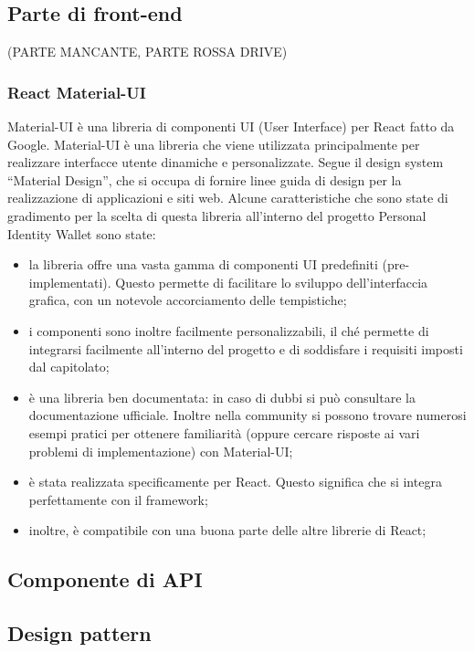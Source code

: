 \subsection{Parte di front-end}
(PARTE MANCANTE, PARTE ROSSA DRIVE)
\subsubsection{React Material-UI}
Material-UI è una libreria di componenti UI (User Interface) per React fatto da Google. Material-UI è una libreria che viene utilizzata principalmente per realizzare interfacce utente dinamiche e personalizzate.
Segue il design system “Material Design”, che si occupa di fornire linee guida di design per la realizzazione di applicazioni e siti web.
Alcune caratteristiche che sono state di gradimento per la scelta di questa libreria all’interno del progetto Personal Identity Wallet sono state:
\begin{itemize}
    \item la libreria offre una vasta gamma di componenti UI predefiniti (pre-implementati). Questo permette di facilitare lo sviluppo dell’interfaccia grafica, con un notevole accorciamento delle tempistiche;
    \item i componenti sono inoltre facilmente personalizzabili, il ché permette di integrarsi facilmente all’interno del progetto e di soddisfare i requisiti imposti dal capitolato;
    \item è una libreria ben documentata: in caso di dubbi si può consultare la documentazione ufficiale. Inoltre nella community si possono trovare numerosi esempi pratici per ottenere familiarità (oppure cercare risposte ai vari problemi di implementazione) con Material-UI;
    \item è stata realizzata specificamente per React. Questo significa che si integra perfettamente con il framework;
    \item inoltre, è compatibile con una buona parte delle altre librerie di React;
\end{itemize}
\subsection{Componente di API}


\subsection{Design pattern}